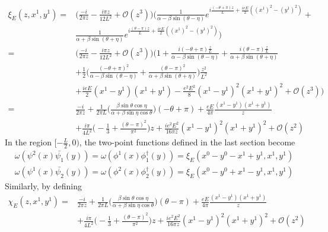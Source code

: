 \begin{equation}
\begin{split}
\xi_E(z, x^1, y^1) = & \Big( \frac{-i}{2 \pi z} - \frac{i \pi z}{12L^2} + \mathcal{O}(z^3) \Big)
\Big( \frac{1}{\alpha - \beta\sin(\theta - \eta)}e^{i\frac{(-\theta + \pi)z}{L} + \frac{ieE}{2}((x^1)^2 - (y^1)^2)} + \\
& \frac{1}{\alpha + \beta\sin(\theta + \eta)}e^{i\frac{(\theta - \pi) z}{L} + \frac{ieE}{2}((x^1)^2 - (y^1)^2)} \Big)  \\
= & \Big( \frac{-i}{2 \pi z} - \frac{i \pi z}{12L^2} + \mathcal{O}(z^3) \Big)
\Big( 1 + \frac{i(-\theta + \pi)\frac{z}{L}}{\alpha - \beta\sin(\theta - \eta)} + \frac{i(\theta - \pi)\frac{z}{L}}{\alpha + \beta\sin(\theta + \eta)}  \\
& + \frac{1}{2}\Big(\frac{(-\theta + \pi)^2}{\alpha - \beta \sin (\theta - \eta)}  
+ \frac{(\theta - \pi)^2}{\alpha + \beta \sin (\theta + \eta)} \Big)\frac{z^2}{L^2} \\
& + \frac{ieE}{2}(x^1 - y^1)(x^1 + y^1) - \frac{e^2 E^2}{8}(x^1 - y^1)^2 (x^1 + y^1)^2
+ \mathcal{O}(z^3)  \Big)  \\
= & \frac{-i}{2 \pi z} + \frac{1}{2\pi L}\Big( \frac{\beta \sin \theta \cos \eta}{\alpha + \beta \sin \eta \cos \theta}\Big) (-\theta + \pi) + \frac{eE}{4 \pi}\frac{(x^1 - y^1)(x^1 + y^1)}{z}     \\
& + \frac{i\pi}{4 L^2}\big( -\frac{1}{3} + \frac{(\theta - \pi)^2}{\pi^2}\big)z
+ \frac{i e^2 E^2}{16 \pi z} (x^1 - y^1)^2 (x^1 + y^1)^2
+ \mathcal{O}(z^2)
\end{split}
\end{equation}
In the region $[-\frac{L}{2}, 0)$, the two-point functions defined in the last section become
\begin{equation*}
\begin{split}
\omega(\psi^2(x) \bar{\psi_1}(y)) = 
\omega(\phi^1(x) \phi^\dagger_1(y)) = \xi_E(x^0 - y^0 - x^1 + y^1, x^1, y^1) \\
 \omega(\psi^1(x) \bar{\psi_2}(y)) = 
\omega(\phi^2(x) \phi^\dagger_2(y)) = \xi_E(x^0 - y^0 + x^1 - y^1, x^1, y^1)
\end{split}
\end{equation*}
Similarly, by defining 
\begin{equation}
\begin{split}
\chi_E(z, x^1, y^1) = 
& \frac{-i}{2 \pi z} + \frac{1}{2\pi L}\Big( \frac{\beta \sin \theta \cos \eta}{\alpha + \beta \sin \eta \cos \theta}\Big) (\theta - \pi) + \frac{eE}{4 \pi}\frac{(x^1 - y^1)(x^1 + y^1)}{z}     \\
& + \frac{i\pi}{4 L^2}\big( -\frac{1}{3} + \frac{(\theta - \pi)^2}{\pi^2}\big)z
+ \frac{i e^2 E^2}{16 \pi z} (x^1 - y^1)^2 (x^1 + y^1)^2
+ \mathcal{O}(z^2)
\end{split}
\end{equation}
